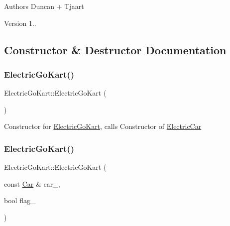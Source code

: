 \begin{DoxyAuthor}{Authors}
Duncan + Tjaart 
\end{DoxyAuthor}
\begin{DoxyVersion}{Version}
1.. 
\end{DoxyVersion}


\subsection{Constructor \& Destructor Documentation}
\mbox{\label{class_electric_go_kart_aa48c98395080aec1ddebdb633327f9ab}} 
\subsubsection{\texorpdfstring{Electric\+Go\+Kart()}{ElectricGoKart()}\hspace{0.1cm}{\footnotesize\ttfamily [1/2]}}
{\footnotesize\ttfamily Electric\+Go\+Kart\+::\+Electric\+Go\+Kart (\begin{DoxyParamCaption}{ }\end{DoxyParamCaption})\hspace{0.3cm}{\ttfamily [inline]}}

Constructor for \mbox{\hyperlink{class_electric_go_kart}{Electric\+Go\+Kart}}, calls Constructor of \mbox{\hyperlink{class_electric_car}{Electric\+Car}} \mbox{\label{class_electric_go_kart_adc3a6b04ae5466f1a05ca6546e2e942e}} 
\subsubsection{\texorpdfstring{Electric\+Go\+Kart()}{ElectricGoKart()}\hspace{0.1cm}{\footnotesize\ttfamily [2/2]}}
{\footnotesize\ttfamily Electric\+Go\+Kart\+::\+Electric\+Go\+Kart (\begin{DoxyParamCaption}\item[{const \mbox{\hyperlink{class_car}{Car}} \&}]{car\+\_\+,  }\item[{bool}]{flag\+\_\+ }\end{DoxyParamCaption})\hspace{0.3cm}{\ttfamily [inline]}}

